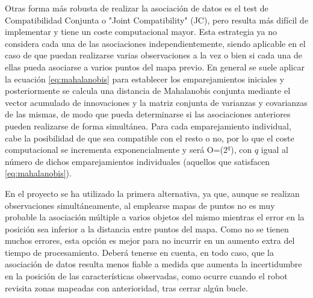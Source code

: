 Otras forma más robusta de realizar la asociación de datos es el test de Compatibilidad Conjunta o "Joint Compatibility" (JC), pero resulta más difícil de implementar y tiene un coste computacional mayor. Esta estrategia ya no considera cada una de las asociaciones independientemente, siendo aplicable en el caso de que puedan realizarse varias observaciones a la vez o bien si cada una de ellas pueda asociarse a varios puntos del mapa previo. En general se suele aplicar la ecuación \ref{eq:mahalanobis} para establecer los emparejamientos iniciales y posteriormente se calcula una distancia de Mahalanobis conjunta mediante el vector acumulado de innovaciones y la matriz conjunta de varianzas y covarianzas de las mismas, de modo que pueda determinarse si las asociaciones anteriores pueden realizarse de forma simultánea. Para cada emparejamiento individual, cabe la posibilidad de que sea compatible con el resto o no, por lo que el coste computacional se incrementa exponencialmente y será O=($2^{q}$), con $q$ igual al número de dichos emparejamientos individuales (aquellos que satisfacen \ref{eq:mahalanobis}).

En el proyecto se ha utilizado la primera alternativa, ya que, aunque se realizan observaciones simultáneamente, al emplearse mapas de puntos no es muy probable la asociación múltiple a varios objetos del mismo mientras el error en la posición sea inferior a la distancia entre puntos del mapa. Como no se tienen muchos errores, esta opción es mejor para no incurrir en un aumento extra del tiempo de procesamiento. Deberá tenerse en cuenta, en todo caso, que la asociación de datos resulta menos fiable a medida que aumenta la incertidumbre en la posición de las características observadas, como ocurre cuando el robot revisita zonas mapeadas con anterioridad, tras cerrar algún bucle.


